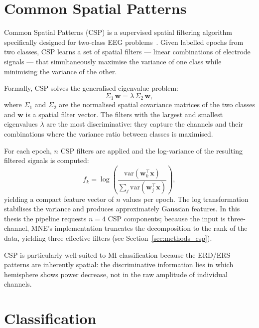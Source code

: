 \documentclass[english, bc, kiv, he, iso690alph, pdf]{fasthesis}
\begin{document}
\section{Common Spatial Patterns}

Common Spatial Patterns (CSP) is a supervised spatial filtering algorithm specifically designed for two-class EEG problems~\cite{blankertz2008optimizing}. Given labelled epochs from two classes, CSP learns a set of spatial filters — linear combinations of electrode signals — that simultaneously maximise the variance of one class while minimising the variance of the other.

Formally, CSP solves the generalised eigenvalue problem:
\begin{equation}
    \Sigma_1 \, \mathbf{w} = \lambda \, \Sigma_2 \, \mathbf{w},
\end{equation}
where $\Sigma_1$ and $\Sigma_2$ are the normalised spatial covariance matrices of the two classes and $\mathbf{w}$ is a spatial filter vector. The filters with the largest and smallest eigenvalues $\lambda$ are the most discriminative: they capture the channels and their combinations where the variance ratio between classes is maximised.

For each epoch, $n$ CSP filters are applied and the log-variance of the resulting filtered signals is computed:
\begin{equation}
    f_k = \log \left( \frac{\mathrm{var}(\mathbf{w}_k^\top \mathbf{x})}{\sum_j \mathrm{var}(\mathbf{w}_j^\top \mathbf{x})} \right),
\end{equation}
yielding a compact feature vector of $n$ values per epoch. The log transformation stabilises the variance and produces approximately Gaussian features. In this thesis the pipeline requests $n = 4$ CSP components; because the input is three-channel, MNE's implementation truncates the decomposition to the rank of the data, yielding three effective filters (see Section~\ref{sec:methods_csp}).

CSP is particularly well-suited to MI classification because the ERD/ERS patterns are inherently spatial: the discriminative information lies in which hemisphere shows power decrease, not in the raw amplitude of individual channels.

\section{Classification}
\end{document}
